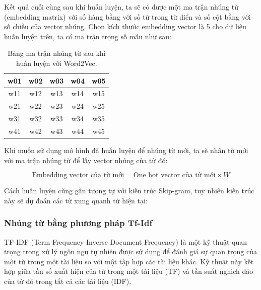 \documentclass[a4paper, 12pt, openany]{book}
\begin{document}
Kết quả cuối cùng sau khi huấn luyện, ta sẽ có được  một ma trận nhúng từ (embedding matrix) với số hàng bằng với số từ trong từ điển và số cột bằng với số chiều của vector nhúng.
Chọn kích thước embedding vector là 5 cho dữ liệu huấn luyện trên, ta có ma trận trọng số mẫu như sau:

\begin{table}[H]
    \centering
    \begin{tabular}{|c|c|c|c|c|}
        \hline
        w01 & w02 & w03 & w04 & w05 \\ \hline
        w11 & w12 & w13 & w14 & w15 \\ \hline
        w21 & w22 & w23 & w24 & w25 \\ \hline
        w31 & w32 & w33 & w34 & w35 \\ \hline
        w41 & w42 & w43 & w44 & w45 \\ \hline
    \end{tabular}
    \caption{Bảng ma trận nhúng từ sau khi huấn luyện với Word2Vec.}
\end{table}

Khi muốn sử dụng mô hình đã huấn luyện để nhúng từ mới, ta sẽ nhân từ mới với ma trận nhúng từ để lấy vector nhúng của từ đó:

\begin{equation}
    \text{Embedding vector của từ mới} = \text{One hot vector của từ mới} \times W
\end{equation}

Cách huấn luyện cũng gần tương tự với kiến trúc Skip-gram, tuy nhiên kiến trúc này sẽ dự đoán các từ xung quanh từ hiện tại:

\subsubsection{Nhúng từ bằng phương pháp Tf-Idf}


TF-IDF (Term Frequency-Inverse Document Frequency) là một kỹ thuật quan trọng trong xử lý ngôn ngữ tự nhiên được sử dụng để đánh giá sự quan trọng của một từ trong một tài liệu so với một tập hợp các tài liệu khác. Kỹ thuật này kết hợp giữa tần số xuất hiện của từ trong một tài liệu (TF) và tần suất nghịch đảo của từ đó trong tất cả các tài liệu (IDF).
\end{document}
